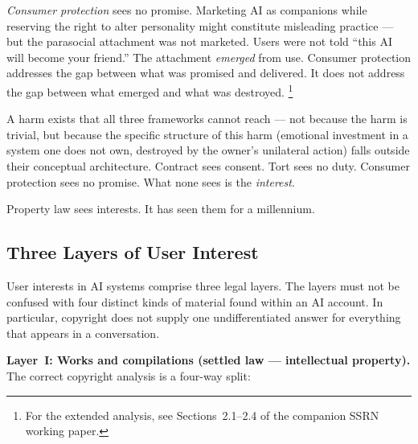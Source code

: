 \emph{Consumer protection} sees no promise. Marketing AI as companions while reserving the right to alter personality might constitute misleading practice --- but the parasocial attachment was not marketed. Users were not told ``this AI will become your friend.'' The attachment \emph{emerged} from use. Consumer protection addresses the gap between what was promised and delivered. It does not address the gap between what emerged and what was destroyed. \footnote{For the extended analysis, see Sections~2.1--2.4 of the companion SSRN working paper.}

A harm exists that all three frameworks cannot reach --- not because the harm is trivial, but because the specific structure of this harm (emotional investment in a system one does not own, destroyed by the owner's unilateral action) falls outside their conceptual architecture. Contract sees consent. Tort sees no duty. Consumer protection sees no promise. What none sees is the \emph{interest}.

Property law sees interests. It has seen them for a millennium.

\subsection{Three Layers of User Interest}
\label{sec:three-layers}

User interests in AI systems comprise three legal layers. The layers must not be confused with four distinct kinds of material found within an AI account. In particular, copyright does not supply one undifferentiated answer for everything that appears in a conversation.

\textbf{Layer~I: Works and compilations (settled law --- intellectual property).} The correct copyright analysis is a four-way split:


